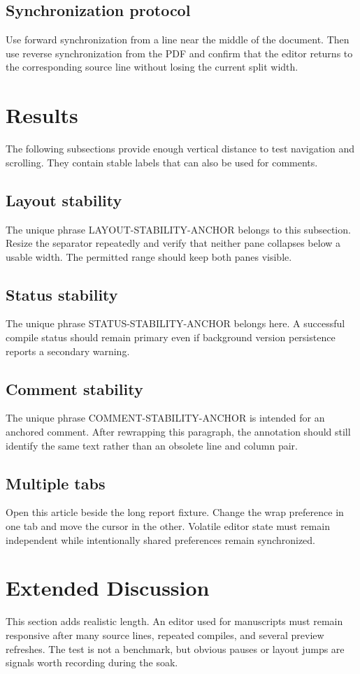 \documentclass[11pt]{article}
\begin{document}
\subsection{Synchronization protocol}
Use forward synchronization from a line near the middle of the document. Then
use reverse synchronization from the PDF and confirm that the editor returns to
the corresponding source line without losing the current split width.

\section{Results}
The following subsections provide enough vertical distance to test navigation
and scrolling. They contain stable labels that can also be used for comments.

\subsection{Layout stability}
The unique phrase LAYOUT-STABILITY-ANCHOR belongs to this subsection. Resize the
separator repeatedly and verify that neither pane collapses below a usable
width. The permitted range should keep both panes visible.

\subsection{Status stability}
The unique phrase STATUS-STABILITY-ANCHOR belongs here. A successful compile
status should remain primary even if background version persistence reports a
secondary warning.

\subsection{Comment stability}
The unique phrase COMMENT-STABILITY-ANCHOR is intended for an anchored comment.
After rewrapping this paragraph, the annotation should still identify the same
text rather than an obsolete line and column pair.

\subsection{Multiple tabs}
Open this article beside the long report fixture. Change the wrap preference in
one tab and move the cursor in the other. Volatile editor state must remain
independent while intentionally shared preferences remain synchronized.

\section{Extended Discussion}
This section adds realistic length. An editor used for manuscripts must remain
responsive after many source lines, repeated compiles, and several preview
refreshes. The test is not a benchmark, but obvious pauses or layout jumps are
signals worth recording during the soak.
\end{document}
